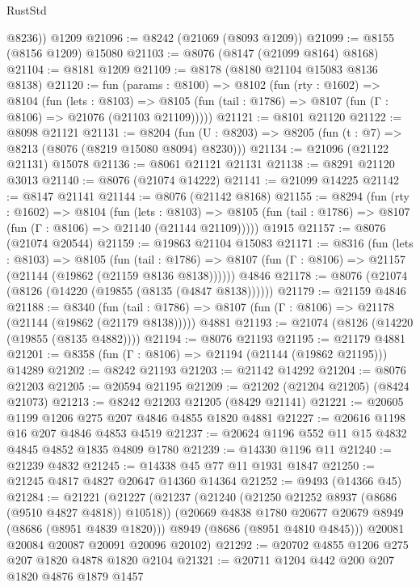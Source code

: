 \begin{lexlean}{RustStd}
\begin{coremodule}
        @8236))
    @1209
@21096 := @8242 (@21069 (@8093 @1209))
@21099 := @8155 (@8156 @1209) @15080
@21103 := @8076 (@8147 (@21099 @8164) @8168)
@21104 := @8181 @1209
@21109 := @8178 (@8180 @21104 @15083 @8136 @8138)
@21120 := fun (params : @8100) =>
  @8102
    (fun (rty : @1602) =>
    @8104
      (fun (lets : @8103) =>
      @8105 (fun (tail : @1786) => @8107 (fun (Γ : @8106) => @21076 (@21103 @21109)))))
@21121 := @8101 @21120
@21122 := @8098 @21121
@21131 := @8204
    (fun (U : @8203) => @8205 (fun (t : @7) => @8213 (@8076 (@8219 @15080 @8094) @8230)))
@21134 := @21096 (@21122 @21131) @15078
@21136 := @8061 @21121 @21131
@21138 := @8291 @21120 @3013
@21140 := @8076 (@21074 @14222)
@21141 := @21099 @14225
@21142 := @8147 @21141
@21144 := @8076 (@21142 @8168)
@21155 := @8294
    (fun (rty : @1602) =>
    @8104
      (fun (lets : @8103) =>
      @8105 (fun (tail : @1786) => @8107 (fun (Γ : @8106) => @21140 (@21144 @21109)))))
    @1915
@21157 := @8076 (@21074 @20544)
@21159 := @19863 @21104 @15083
@21171 := @8316
    (fun (lets : @8103) =>
    @8105
      (fun (tail : @1786) =>
      @8107 (fun (Γ : @8106) => @21157 (@21144 (@19862 (@21159 @8136 @8138))))))
    @4846
@21178 := @8076 (@21074 (@8126 (@14220 (@19855 (@8135 (@4847 @8138))))))
@21179 := @21159 @4846
@21188 := @8340
    (fun (tail : @1786) => @8107 (fun (Γ : @8106) => @21178 (@21144 (@19862 (@21179 @8138)))))
    @4881
@21193 := @21074 (@8126 (@14220 (@19855 (@8135 @4882))))
@21194 := @8076 @21193
@21195 := @21179 @4881
@21201 := @8358 (fun (Γ : @8106) => @21194 (@21144 (@19862 @21195))) @14289
@21202 := @8242 @21193
@21203 := @21142 @14292
@21204 := @8076 @21203
@21205 := @20594 @21195
@21209 := @21202 (@21204 @21205) (@8424 @21073)
@21213 := @8242 @21203 @21205 (@8429 @21141)
@21221 := @20605 @1199 @1206 @275 @207 @4846 @4855 @1820 @4881
@21227 := @20616 @1198 @16 @207 @4846 @4853 @4519
@21237 := @20624 @1196 @552 @11 @15 @4832 @4845 @4852 @1835 @4809 @1780
@21239 := @14330 @1196 @11
@21240 := @21239 @4832
@21245 := @14338 @45 @77 @11 @1931 @1847
@21250 := @21245 @4817 @4827 @20647 @14360 @14364
@21252 := @9493 (@14366 @45)
@21284 := @21221
    (@21227
      (@21237
        (@21240 (@21250 @21252 @8937 (@8686 (@9510 @4827 @4818)) @10518))
        (@20669 @4838 @1780 @20677 @20679 @8949 (@8686 (@8951 @4839 @1820)))
        @8949
        (@8686 (@8951 @4810 @4845)))
      @20081
      @20084
      @20087
      @20091
      @20096
      @20102)
@21292 := @20702 @4855 @1206 @275 @207 @1820 @4878 @1820 @2104
@21321 := @20711
    @1204
    @442
    @200
    @207
    @1820
    @4876
    @1879
    @1457

\end{coremodule}
\end{lexlean}
